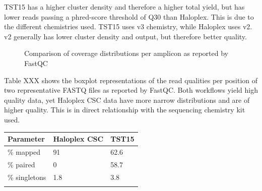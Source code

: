 TST15 has a higher cluster density and therefore a higher total yield, but has
lower reads passing a phred-score threshold of Q30 than Haloplex. This is due to
the different chemistries used. TST15 uses v3 chemistry, while Haloplex uses v2.
v2 generally has lower cluster density and output, but therefore better quality.

\begin{figure}[!tbp]
  \centering
  \hfill
  \caption{Comparison of coverage distributions per amplicon as reported by FastQC}
\end{figure}

Table XXX shows the boxplot representations of the read qualities per position
of two representative FASTQ files as reported by FastQC. Both workflows yield high
quality data, yet Haloplex CSC data have more narrow distributions and are of higher
quality. This is in direct relationship with the sequencing chemistry kit used.

\begin{table}
\begin{tabular}{p{3.5cm} p{1cm} p{1cm}}\\
\hline
Parameter & Haloplex CSC & TST15 \\
\hline
\% mapped & 91 & 62.6 \\
\% paired & 0 & 58.7 \\
\% singletons & 1.8 & 3.8 \\
\label{samtools_flagstat}
\end{tabular}
\end{table}

